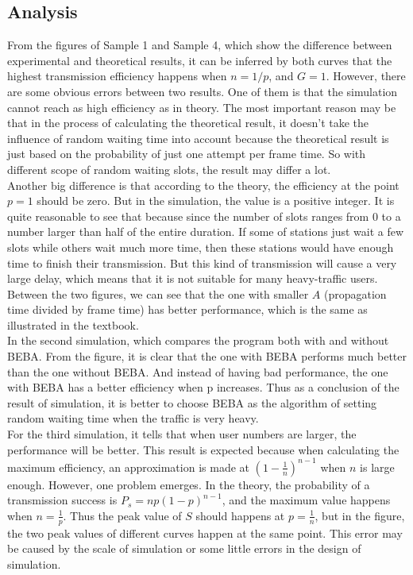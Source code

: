\documentclass[11pt,a4paper]{report}
\begin{document}
\subsection*{Analysis}
From the figures of Sample 1 and Sample 4, which show the difference between experimental and theoretical results, it can be inferred by both curves that the highest transmission efficiency happens when \(n = 1/p\), and \(G = 1\). However, there are some obvious errors between two results. One of them is that the simulation cannot reach as high efficiency as in theory. The most important reason may be that in the process of calculating the theoretical result, it doesn’t take the influence of random waiting time into account because the theoretical result is just based on the probability of just one attempt per frame time. So with different scope of random waiting slots, the result may differ a lot. \\ 

Another big difference is that according to the theory, the efficiency at the point \(p = 1\) should be zero. But in the simulation, the value is a positive integer. It is quite reasonable to see that because since the number of slots ranges from 0 to a number larger than half of the entire duration. If some of stations just wait a few slots while others wait much more time, then these stations would have enough time to finish their transmission. But this kind of transmission will cause a very large delay, which means that it is not suitable for many heavy-traffic users. \\

Between the two figures, we can see that the one with smaller \(A\) (propagation time divided by frame time) has better performance, which is the same as illustrated in the textbook. \\

In the second simulation, which compares the program both with and without BEBA. From the figure, it is clear that the one with BEBA performs much better than the one without BEBA. And instead of having bad performance, the one with BEBA has a better efficiency when p increases. Thus as a conclusion of the result of simulation, it is better to choose BEBA as the algorithm of setting random waiting time when the traffic is very heavy. \\

For the third simulation, it tells that when user numbers are larger, the performance will be better. This result is expected because when calculating the maximum efficiency, an approximation is made at \((1-\frac{1}{n})^{n-1}\) when \(n\) is large enough. However, one problem emerges. In the theory, the probability of a transmission success is \(P_s = np(1-p)^{n-1}\), and the maximum value happens when \(n = \frac{1}{p}\). Thus the peak value of \(S\) should happens at \(p = \frac{1}{n}\), but in the figure, the two peak values of different curves happen at the same point. This error may be caused by the scale of simulation or some little errors in the design of simulation. \\
\end{document}
